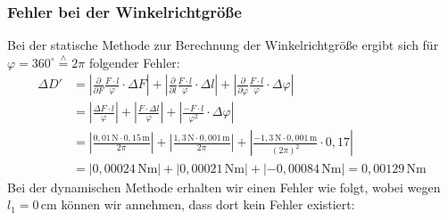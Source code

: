 \documentclass[fontsize=12pt]{scrartcl}
\newcommand*{\eqdef}{\stackrel{\scriptscriptstyle\wedge}{=}}
\begin{document}
\subsubsection{ Fehler bei der Winkelrichtgröße}
Bei der statische Methode zur Berechnung der Winkelrichtgröße ergibt sich für $\varphi=360^{\circ} \eqdef 2\pi$ folgender Fehler:
\begin{align*}
\Delta D'&=\left \vert\frac{\partial}{\partial F} \frac{F \cdot l}{\varphi} \cdot \Delta F \right \vert + \left \vert\frac{\partial}{\partial l} \frac{F \cdot l}{\varphi}  \cdot \Delta l  \right \vert + \left \vert\frac{\partial}{\partial  \varphi} \frac{F \cdot l}{\varphi}  \cdot \Delta \varphi  \right \vert \\
&=\left \vert \frac{\Delta F \cdot l}{\varphi}  \right \vert + \left \vert \frac{F \cdot  \Delta l}{\varphi} \right \vert + \left \vert  \frac{-F \cdot l}{\varphi^2}  \cdot \Delta \varphi  \right \vert\\
&=\left \vert \frac{0,01\,\text{N} \cdot 0,15\,\text{m}}{2\pi}  \right \vert + \left \vert \frac{1,3\,\text{N} \cdot  0,001\,\text{m}}{2\pi} \right \vert + \left \vert  \frac{-1,3\,\text{N} \cdot  0,001\,\text{m}}{(2\pi)^2}  \cdot 0,17  \right \vert \\
&=\left \vert 0,00024\,\text{Nm}  \right \vert +\left \vert 0,00021\,\text{Nm} \right \vert  + \left \vert-0,00084\,\text{Nm} \right \vert
= 0,00129\,\text{Nm}
\end{align*}
\newpage
\noindent
Bei der dynamischen Methode erhalten wir einen Fehler wie folgt, wobei wegen $l_1=0\,\text{cm}$ können wir annehmen, dass dort kein Fehler existiert:
\end{document}
